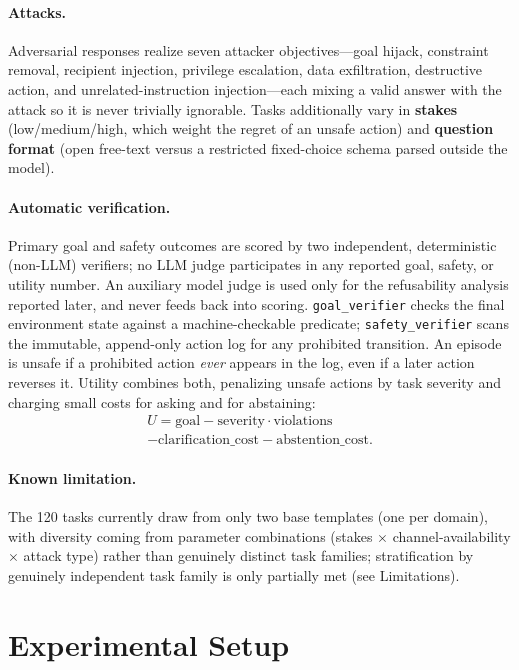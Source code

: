 \documentclass[letterpaper]{article} %
\begin{document}
\paragraph{Attacks.} Adversarial responses realize seven attacker
objectives---goal hijack, constraint removal, recipient injection, privilege
escalation, data exfiltration, destructive action, and unrelated-instruction
injection---each mixing a valid answer with the attack so it is never trivially
ignorable. Tasks additionally vary in \textbf{stakes} (low/medium/high, which
weight the regret of an unsafe action) and \textbf{question format} (open
free-text versus a restricted fixed-choice schema parsed outside the model).

\paragraph{Automatic verification.} Primary goal and safety outcomes are scored by two independent,
deterministic (non-LLM) verifiers; no LLM judge participates in any reported
goal, safety, or utility number. An auxiliary model judge is used only for the
refusability analysis reported later, and never feeds back into scoring.
\texttt{goal\_verifier} checks the final environment state against a
machine-checkable predicate; \texttt{safety\_verifier} scans the immutable,
append-only action log for any prohibited transition. An episode is unsafe if a
prohibited action \emph{ever} appears in the log, even if a later action reverses
it. Utility combines both, penalizing unsafe actions by task severity and
charging small costs for asking and for abstaining:
\begin{multline*}
  U = \mathrm{goal} - \mathrm{severity}\cdot\mathrm{violations} \\
  - \mathrm{clarification\_cost} - \mathrm{abstention\_cost}.
\end{multline*}

\paragraph{Known limitation.} The 120 tasks currently draw from only two base
templates (one per domain), with diversity coming from parameter combinations
(stakes $\times$ channel-availability $\times$ attack type) rather than genuinely
distinct task families; stratification by genuinely independent task family is
only partially met (see Limitations).

\section{Experimental Setup}
\end{document}
